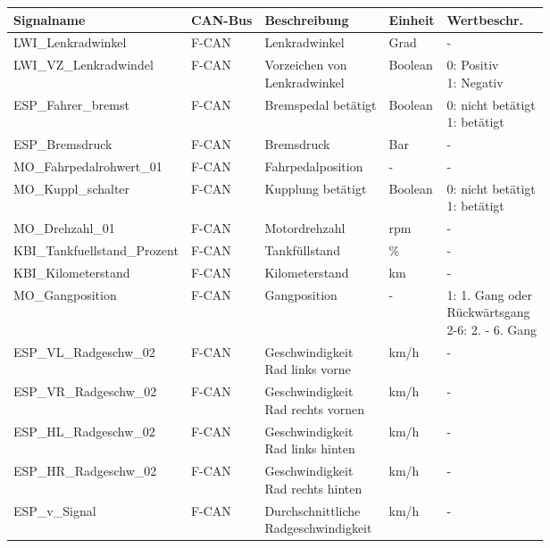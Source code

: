 \begin{table}[htbp]
	\centering
		\begin{tabular}{|l|l|l|l|l|}
		\hline
		\rowcolor[gray]{0.9}
		Signalname & CAN-Bus & Beschreibung & Einheit & Wertbeschr. \\
		\hline
    LWI\_Lenkradwinkel & F-CAN & Lenkradwinkel & Grad & - \\
    LWI\_VZ\_Lenkradwindel & F-CAN & \shortstack{Vorzeichen von \\ Lenkradwinkel} & Boolean & \shortstack{0: Positiv \\ 1: Negativ} \\
    ESP\_Fahrer\_bremst & F-CAN & Bremspedal betätigt & Boolean & \shortstack{0: nicht betätigt \\ 1: betätigt} \\
    ESP\_Bremsdruck & F-CAN & Bremsdruck & Bar & - \\
    MO\_Fahrpedalrohwert\_01 & F-CAN & Fahrpedalposition & - & - \\
    MO\_Kuppl\_schalter & F-CAN & Kupplung betätigt & Boolean & \shortstack{0: nicht betätigt \\ 1: betätigt} \\
    MO\_Drehzahl\_01 & F-CAN & Motordrehzahl & rpm & - \\
    KBI\_Tankfuellstand\_Prozent & F-CAN & Tankfüllstand & \% & - \\
    KBI\_Kilometerstand & F-CAN & Kilometerstand & km & - \\
    MO\_Gangposition & F-CAN & Gangposition & - & \shortstack{1: 1. Gang oder \\ Rückwärtsgang \\ 2-6: 2. - 6. Gang} \\
    ESP\_VL\_Radgeschw\_02 & F-CAN & \shortstack{Geschwindigkeit \\ Rad links vorne} & km/h & - \\
    ESP\_VR\_Radgeschw\_02 & F-CAN & \shortstack{Geschwindigkeit \\ Rad rechts vornen} & km/h & - \\
    ESP\_HL\_Radgeschw\_02 & F-CAN & \shortstack{Geschwindigkeit \\ Rad links hinten} & km/h & - \\
    ESP\_HR\_Radgeschw\_02 & F-CAN & \shortstack{Geschwindigkeit \\ Rad rechts hinten} & km/h & - \\
    ESP\_v\_Signal & F-CAN & \shortstack{Durchschnittliche \\ Radgeschwindigkeit} & km/h & - \\

\end{tabular}
\end{table}
